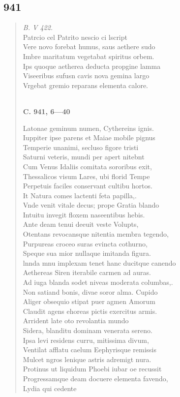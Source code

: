 \documentclass[11pt, a4paper]{report}
\begin{document}
            \subsection*{941}
      \begin{verse}
      \textit{B. V 422.} \\ Patrcio cel Patrito nescio ci lscript \\ Vere novo forebat humus, saus aethere sudo \\ Imbre maritatum vegetabat spiritus orbem. \\ Ips quoque aetherea deducta propgine lamma \\ Viseeribus sufusn cavis nova gemina largo \\ Vrgebat gremio reparans elementa calore. \\ 
        ﻿\pagebreak 
    \begin{center} \textbf{C. 941, 6—40} \end{center} \marginpar{[362]} Latonae geminum numen, Cythereins ignis. \\ Iuppiter ipse parens et Maiae mobile pignus \\ Temperie unanimi, secluso figore tristi \\ Saturni veteris, mundi per apert nitebnt \\ Cum Venus Idaliis comitata sororibus exit, \\ Thessalicos visum Lares, ubi florid Tempe \\ Perpetuis faciles conservant cultibu hortos. \\ It Natura comes lactenti feta papilla,. \\ Vnde venit vitale decus; prope Gratia blando \\ Intuitu invegit floxem naseentibus hebis. \\ Ante deam tenui deeuit veste Volupts, \\ Otentans revocansque nitentia membra tegendo, \\ Purpureas croceo suras evincta cothurno, \\ Speque sua mior nullaque imitanda figura. \\ lnnda mnu implexam tenet hanc ducitque canendo \\ Aethereas Siren iterabile carmen ad auras. \\ Ad iuga blanda sodet niveas moderata columbas,. \\ Non satiand bonis, divae soror alma. Cupido \\ Aliger obsequio stipat puer agmen Amorum \\ Claudit agens ehoreas pictis exercitus armis. \\ Arrident late oto revolantia mundo \\ Sidera, blanditu dominam venerata sereno. \\ Ipsa levi residens curru, mitissima divum, \\ Ventilat afflatu caelum Eephyrisque remissis \\ Mulcet ngros lenique astris adremigt nura. \\ Protinus ut liquidum Phoebi iubar oe recussit \\ Progressamque deam docuere elementa favendo, \\ Lydia qui cedente 
\end{verse}
\end{document}
